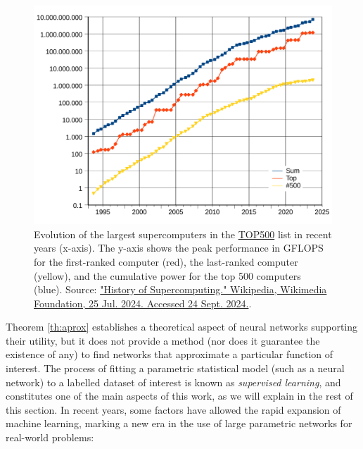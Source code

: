 \begin{figure}
    \centering
    \includegraphics[width=0.7\linewidth]{img/ML/HPC.png}
    \caption{Evolution of the largest supercomputers in the \href{https://top500.org}{\textsc{TOP500}} list  in recent years (x-axis). The y-axis shows the peak performance in GFLOPS for the first-ranked computer (red), the last-ranked computer (yellow), and the cumulative power for the top 500 computers (blue). Source: \href{https://en.wikipedia.org/wiki/History_of_supercomputing}{"History of Supercomputing." Wikipedia, Wikimedia Foundation, 25 Jul. 2024. Accessed 24 Sept. 2024.}.}
    \label{fig:ML_HPC}
\end{figure}


Theorem \ref{th:aprox} establishes a theoretical aspect of neural networks supporting their utility, but it does not provide a method (nor does it guarantee the existence of any) to find networks that approximate a particular function of interest. The process of fitting a parametric statistical model (such as a neural network) to a labelled dataset of interest is known as \emph{supervised learning}, and constitutes one of the main aspects of this work, as we will explain in the rest of this section.
In recent years, some factors have allowed the rapid expansion of machine learning, marking a new era in the use of large parametric networks for real-world problems:

